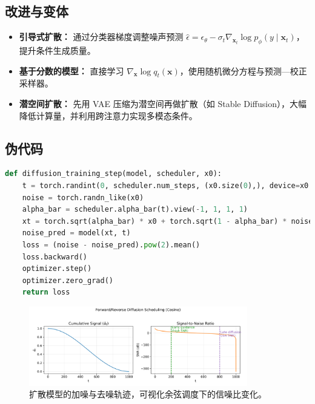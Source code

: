 \documentclass[UTF8,zihao=-4]{ctexart}
\begin{document}
\subsection{改进与变体}
\begin{itemize}
  \item \textbf{引导式扩散：} 通过分类器梯度调整噪声预测 $\hat{\epsilon} = \epsilon_\theta - \sigma_t \nabla_{\mathbf{x}_t} \log p_\phi(y \mid \mathbf{x}_t)$，提升条件生成质量。
  \item \textbf{基于分数的模型：} 直接学习 $\nabla_{\mathbf{x}} \log q_t(\mathbf{x})$，使用随机微分方程与预测—校正采样器。
  \item \textbf{潜空间扩散：} 先用 VAE 压缩为潜空间再做扩散（如 Stable Diffusion），大幅降低计算量，并利用跨注意力实现多模态条件。
\end{itemize}

\subsection{伪代码}
\begin{lstlisting}[language=Python, caption={采用余弦噪声调度的扩散训练步骤。}]
def diffusion_training_step(model, scheduler, x0):
    t = torch.randint(0, scheduler.num_steps, (x0.size(0),), device=x0.device)
    noise = torch.randn_like(x0)
    alpha_bar = scheduler.alpha_bar(t).view(-1, 1, 1, 1)
    xt = torch.sqrt(alpha_bar) * x0 + torch.sqrt(1 - alpha_bar) * noise
    noise_pred = model(xt, t)
    loss = (noise - noise_pred).pow(2).mean()
    loss.backward()
    optimizer.step()
    optimizer.zero_grad()
    return loss
\end{lstlisting}

\begin{figure}[H]
  \centering
  \includegraphics[width=0.85\textwidth]{diffusion_process.png}
  \caption{扩散模型的加噪与去噪轨迹，可视化余弦调度下的信噪比变化。}
  \label{fig:diffusion_process_cn}
\end{figure}
\FloatBarrier
\end{document}
